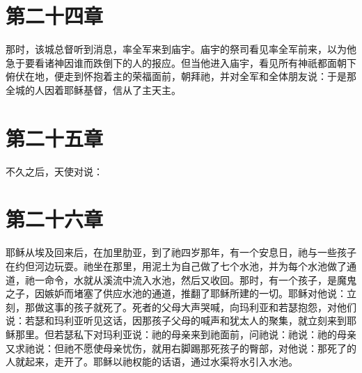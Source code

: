 
\section{第二十四章}

那时，该城总督听到消息，率全军来到庙宇。庙宇的祭司看见率全军前来，以为他急于要看诸神因谁而跌倒下的人的报应。但当他进入庙宇，看见所有神祇都面朝下俯伏在地，便走到怀抱着主的荣福面前，朝拜祂，并对全军和全体朋友说：于是那全城的人因着耶稣基督，信从了主天主。\par


\section{第二十五章}

不久之后，天使对说：\par


\section{第二十六章}

耶稣从埃及回来后，在加里肋亚，到了祂四岁那年，有一个安息日，祂与一些孩子在约但河边玩耍。祂坐在那里，用泥土为自己做了七个水池，并为每个水池做了通道，祂一命令，水就从溪流中流入水池，然后又收回。那时，有一个孩子，是魔鬼之子，因嫉妒而堵塞了供应水池的通道，推翻了耶稣所建的一切。耶稣对他说：立刻，那做这事的孩子就死了。死者的父母大声哭喊，向玛利亚和若瑟抱怨，对他们说：若瑟和玛利亚听见这话，因那孩子父母的喊声和犹太人的聚集，就立刻来到耶稣那里。但若瑟私下对玛利亚说：祂的母亲来到祂面前，问祂说：祂说：祂的母亲又求祂说：但祂不愿使母亲忧伤，就用右脚踢那死孩子的臀部，对他说：那死了的人就起来，走开了。耶稣以祂权能的话语，通过水渠将水引入水池。\par

